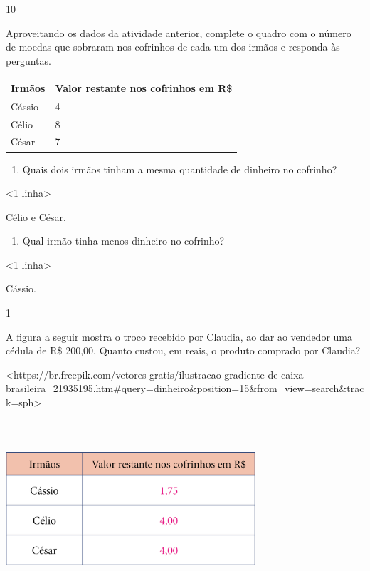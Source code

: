 {{{{{{{{{\num{10}

Aproveitando os dados da atividade anterior, complete o quadro com o número de moedas que sobraram nos cofrinhos de cada um dos irmãos e responda às
perguntas.

\begin{longtable}[]{@{}ll@{}}
\toprule
Irmãos & Valor restante nos cofrinhos em R\$\tabularnewline
\midrule
\endhead
Cássio & 4\tabularnewline
Célio & 8\tabularnewline
César & 7\tabularnewline
\bottomrule
\end{longtable}

\begin{enumerate}
\def\labelenumi{\alph{enumi})}
\item
  Quais dois irmãos tinham a mesma quantidade de dinheiro no cofrinho?
\end{enumerate}

\textless{}1 linha\textgreater{}

Célio e César.

\begin{enumerate}
\def\labelenumi{\alph{enumi})}
\item
  Qual irmão tinha menos dinheiro no cofrinho?
\end{enumerate}

\textless{}1 linha\textgreater{}

Cássio.


\num{1}

A figura a seguir mostra o troco recebido por Claudia, ao dar ao vendedor
uma cédula de R\$ 200,00. Quanto custou, em reais, o produto comprado por Claudia?

\textless{}https://br.freepik.com/vetores-gratis/ilustracao-gradiente-de-caixa-brasileira\_21935195.htm\#query=dinheiro\&position=15\&from\_view=search\&track=sph\textgreater{}

\includegraphics[width=3.65497in,height=2.60417in]{media/image77.png}

}}}}}}}}}
